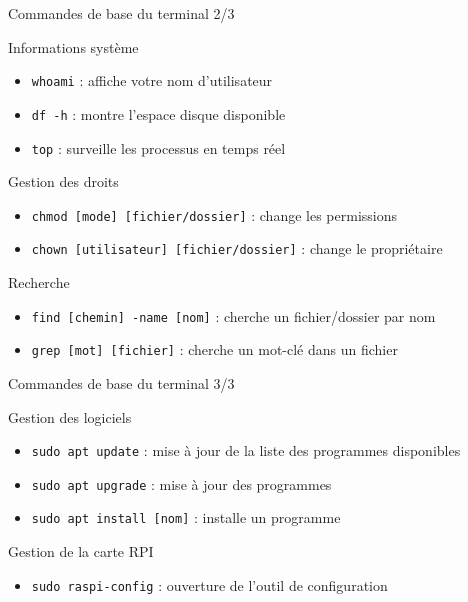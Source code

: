 \documentclass[aspectratio=169,xcolor=dvipsnames]{beamer}
\begin{document}

\begin{frame}{Commandes de base du terminal 2/3}

    Informations système
    \begin{itemize}
        \item \texttt{whoami} : affiche votre nom d'utilisateur
        \item \texttt{df -h} : montre l'espace disque disponible
        \item \texttt{top} : surveille les processus en temps réel
    \end{itemize}

    Gestion des droits
    \begin{itemize}
        \item \texttt{chmod [mode] [fichier/dossier]} : change les permissions
        \item \texttt{chown [utilisateur] [fichier/dossier]} : change le propriétaire
    \end{itemize}

    Recherche
    \begin{itemize}
        \item \texttt{find [chemin] -name [nom]} : cherche un fichier/dossier par nom
        \item \texttt{grep [mot] [fichier]} : cherche un mot-clé dans un fichier
    \end{itemize}

\end{frame}


\begin{frame}{Commandes de base du terminal 3/3}

    Gestion des logiciels
    \begin{itemize}
        \item \texttt{sudo apt update} : mise à jour de la liste des programmes disponibles
        \item \texttt{sudo apt upgrade} : mise à jour des programmes
        \item \texttt{sudo apt install [nom]} : installe un programme
    \end{itemize}

    Gestion de la carte RPI
    \begin{itemize}
        \item \texttt{sudo raspi-config} : ouverture de l'outil de configuration
    \end{itemize}

\end{frame}
\end{document}
